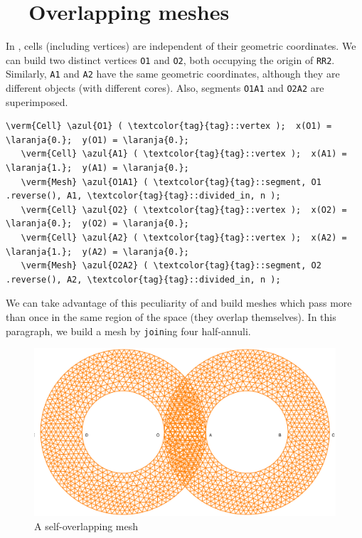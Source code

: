 \section{~~Overlapping meshes}\label{\numb section 3.\numb parag 21}

In \maniFEM, cells (including vertices) are independent of their geometric coordinates.
We can build two distinct vertices {\small\tt O1} and {\small\tt O2}, both occupying
the origin of {\small\tt RR2}.
Similarly, {\small\tt A1} and {\small\tt A2} have the same geometric coordinates,
although they are different {\small\tt{}} objects (with different cores).
Also, segments {\small\tt O1A1} and {\small\tt O2A2} are superimposed.

\begin{Verbatim}[commandchars=\\\{\},formatcom=\small\tt,frame=single,
   label=parag-\ref{\numb section 3.\numb parag 21}.cpp,rulecolor=\color{moldura},
   baselinestretch=0.94,framesep=2mm                                              ]
   \verm{Cell} \azul{O1} ( \textcolor{tag}{tag}::vertex );  x(O1) = \laranja{0.};  y(O1) = \laranja{0.};
   \verm{Cell} \azul{A1} ( \textcolor{tag}{tag}::vertex );  x(A1) = \laranja{1.};  y(A1) = \laranja{0.};
   \verm{Mesh} \azul{O1A1} ( \textcolor{tag}{tag}::segment, O1 .reverse(), A1, \textcolor{tag}{tag}::divided_in, n );
   \verm{Cell} \azul{O2} ( \textcolor{tag}{tag}::vertex );  x(O2) = \laranja{0.};  y(O2) = \laranja{0.};
   \verm{Cell} \azul{A2} ( \textcolor{tag}{tag}::vertex );  x(A2) = \laranja{1.};  y(A2) = \laranja{0.};
   \verm{Mesh} \azul{O2A2} ( \textcolor{tag}{tag}::segment, O2 .reverse(), A2, \textcolor{tag}{tag}::divided_in, n );
\end{Verbatim}

We can take advantage of this peculiarity of {\maniFEM} and build meshes which pass more than once
in the same region of the space (they overlap themselves).
In this paragraph, we build a mesh by {\small\tt join}ing four half-annuli.

\begin{figure}[ht] \centering
 \includegraphics[width=115mm]{infinity-overlap}
  \caption{A self-overlapping mesh}
  \label{\numb section 3.\numb fig 10}
\end{figure}

